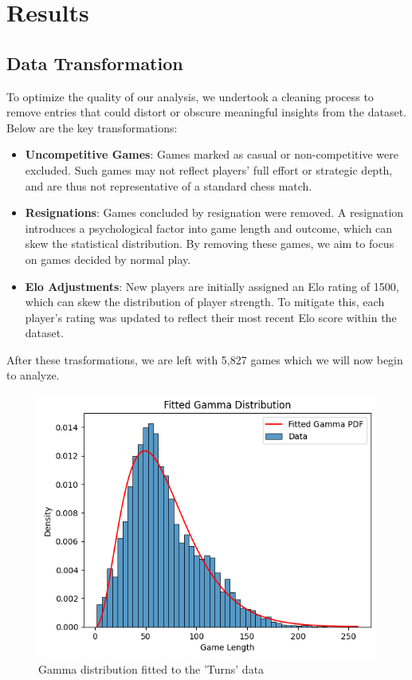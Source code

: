 \documentclass[conference]{IEEEtran}
\begin{document}
\section{Results}
\subsection{Data Transformation}

To optimize the quality of our analysis, we undertook a cleaning process to remove entries that could distort or obscure meaningful insights from the dataset. Below are the key transformations:

\begin{itemize}
    \item \textbf{Uncompetitive Games}: Games marked as casual or non-competitive were excluded. Such games may not reflect players' full effort or strategic depth, and are thus not representative of a standard chess match.   

    \item \textbf{Resignations}: Games concluded by resignation were removed. A resignation introduces a psychological factor into game length and outcome, which can skew the statistical distribution. By removing these games, we aim to focus on games decided by normal play.   
 
    \item \textbf{Elo Adjustments}: New players are initially assigned an Elo rating of 1500, which can skew the distribution of player strength. To mitigate this, each player's rating was updated to reflect their most recent Elo score within the dataset.
\end{itemize}

After these trasformations, we are left with 5,827 games which we will now begin to analyze.

\begin{figure}[H]
    \centering
    \includegraphics[width=0.8\linewidth]{gamma_fit.png}
    \caption{Gamma distribution fitted to the 'Turns' data}
    \label{fig:gamma_fit}
\end{figure}
\end{document}
